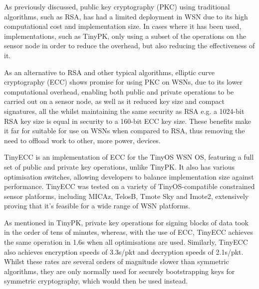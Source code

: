 As previously discussed, public key cryptography (PKC) using traditional algorithms, such as RSA, has had a limited deployment in WSN due to its high computational cost and implementation size. In cases where it has been used, implementations, such as TinyPK, only using a subset of the operations on the sensor node in order to reduce the overhead, but also reducing the effectiveness of it.

As an alternative to RSA and other typical algorithms, elliptic curve cryptography (ECC) shows promise for using PKC on WSNs, due to its lower computational overhead, enabling both public and private operations to be carried out on a sensor node, as well as it reduced key size and compact signatures, all the whilst maintaining the same security as RSA\cite{ECC} e.g. a 1024-bit RSA key size is equal in security to a 160-bit ECC key size. These benefits make it far for suitable for use on WSNs when compared to RSA, thus removing the need to offload work to other, more power, devices\cite{TinyPK}.

TinyECC \cite{TinyECC} is an implementation of ECC for the TinyOS WSN OS, featuring a full set of public and private key operations, unlike TinyPK. It also has various optimisation switches, allowing developers to balance implementation size against performance. TinyECC was tested on a variety of TinyOS-compatible constrained sensor platforms, including MICAz, TelosB, Tmote Sky and Imote2, extensively proving that it's feasible for a wide range of WSN platforms.

As mentioned in TinyPK, private key operations for signing blocks of data took in the order of tens of minutes\cite{TinyPK}, whereas, with the use of ECC, TinyECC achieves the same operation in 1.6s when all optimisations are used. Similarly, TinyECC also achieves encryption speeds of 3.3s/pkt and decryption speeds of 2.1s/pkt. Whilst these rates are several orders of magnitude slower than symmetric algorithms, they are only normally used for securely bootstrapping keys for symmetric cryptography, which would then be used instead.